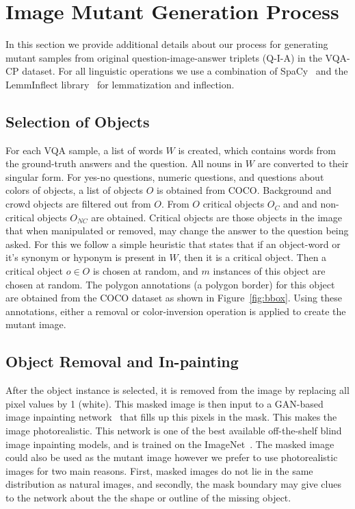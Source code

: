 \section{Image Mutant Generation Process}
    
In this section we provide additional details about our process for generating mutant samples from original question-image-answer triplets (Q-I-A) in the VQA-CP dataset.
For all linguistic operations we use a combination of SpaCy~\cite{honnibal2017spacy} and the LemmInflect library~\cite{lemminflect}
for lemmatization and inflection.

    
    \subsection{Selection of Objects}
    For each VQA sample, a list of words $W$ is created, which contains words from the ground-truth answers and the question.
    All nouns in $W$ are converted to their singular form.
    For yes-no questions, numeric questions, and questions about colors of objects, a list of objects $O$ is obtained from COCO.
    Background and crowd objects are filtered out from $O$.
    From $O$ critical objects $O_C$ and and non-critical objects $O_{NC}$ are obtained.
    Critical objects are those objects in the image that when manipulated or removed, may change the answer to the question being asked.
    For this we follow a simple heuristic that states that if an object-word or it's synonym or hyponym is present in $W$, then it is a critical object.
    Then a critical object $o \in O$ is chosen at random, and $m$ instances of this object are chosen at random.
    The polygon annotations (a polygon border) for this object are obtained from the COCO dataset as shown in Figure~\ref{fig:bbox}.
    Using these annotations, either a removal or color-inversion operation is applied to create the mutant image.
    
    
    \subsection{Object Removal and In-painting}
    After the object instance is selected, it is removed from the image by replacing all pixel values by 1 (white).
    This masked image is then input to a GAN-based image inpainting network~\cite{yu2018generative} that fills up this pixels in the mask.
    This makes the image photorealistic.
    This network is one of the best available off-the-shelf blind image inpainting models, and is trained on the ImageNet~\cite{deng2009imagenet}.
    The masked image could also be used as the mutant image however we prefer to use photorealistic images for two main reasons.
    First, masked images do not lie in the same distribution as natural images, and secondly, the mask boundary may give clues to the network about the the shape or outline of the missing object.
    
